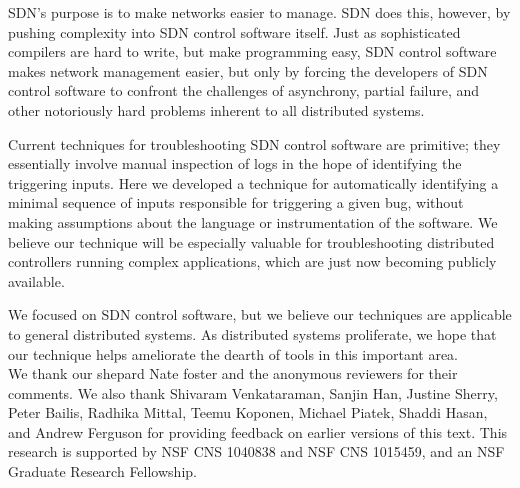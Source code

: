 
SDN's purpose is to make networks easier to manage. SDN
does this, however, by pushing complexity into SDN control software itself. Just
as sophisticated compilers are hard to write, but make programming easy, SDN
control software makes network management easier, but only by forcing the
developers of SDN control software to confront the challenges of asynchrony,
partial failure, and other notoriously hard problems inherent to all distributed
systems.

Current techniques for troubleshooting SDN control software are primitive; they
essentially involve manual inspection of logs in the hope of identifying the
triggering inputs. Here we developed a technique for automatically
identifying a minimal sequence of inputs responsible for triggering a given
bug, without making assumptions about the language or instrumentation of the
software. We believe our technique will be especially valuable for troubleshooting
distributed controllers running complex applications, which are just now
becoming publicly available.

We focused on SDN control software, but we believe our techniques
are applicable to general distributed systems. As distributed systems
proliferate, we hope that our technique helps ameliorate the dearth of
tools in this important area.\\[0.4ex]
%
 We thank our shepard Nate foster and the
anonymous reviewers for their comments.
We also thank Shivaram Venkataraman, Sanjin Han, Justine Sherry, Peter Bailis, Radhika Mittal, Teemu
Koponen, Michael Piatek, Shaddi Hasan, and Andrew Ferguson for providing feedback on earlier versions of this
text. This research is supported by NSF CNS
1040838 and NSF CNS 1015459, and an NSF Graduate Research Fellowship.
\vspace{-1em}



